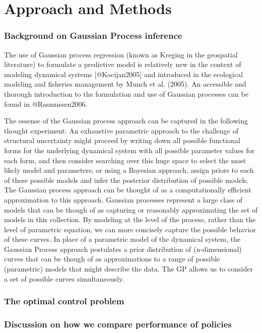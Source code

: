 \documentclass[author-year, review]{elsarticle} %
\begin{document}
\section{Approach and Methods}

\subsubsection{Background on Gaussian Process inference}

The use of Gaussian process regression (known as Kreging in the
geospatial literature) to formulate a predictive model is relatively new
in the context of modeling dynamical systems {[}@Kocijan2005{]} and
introduced in the ecological modeling and fisheries management by Munch
et al. (2005). An accessible and thorough introduction to the
formulation and use of Gaussian processes can be found in
@Rasmussen2006.

The essense of the Gaussian process approach can be captured in the
following thought experiment: An exhaustive parametric approach to the
challenge of structural uncertainty might proceed by writing down all
possible functional forms for the underlying dynamical system with all
possible parameter values for each form, and then consider searching
over this huge space to select the most likely model and parameters; or
using a Bayesian approach, assign priors to each of these possible
models and infer the posterior distribution of possible models. The
Gaussian process approach can be thought of as a computationally
efficient approximation to this approach. Gaussian processes represent a
large class of models that can be though of as capturing or reasonably
approximating the set of models in this collection. By modeling at the
level of the process, rather than the level of parametric equation, we
can more concisely capture the possible behavior of these curves. In
place of a parametric model of the dynamical system, the Gaussian
Process approach postulates a prior distribution of (n-dimensional)
curves that can be though of as approximations to a range of possible
(parametric) models that might describe the data. The GP allows us to
consider a set of possible curves simultaneously.\\

\subsubsection{The optimal control problem}

\subsubsection{Discussion on how we compare performance of policies}
\end{document}
